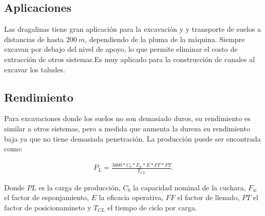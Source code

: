 \documentclass[a4paper]{article}
\begin{document}
\subsection{Aplicaciones}

Las dragalinas tiene gran aplicación para la excavación y y transporte de suelos
a distancias de hasta $\SI{200}{m}$, dependiendo de la pluma de la máquina. 
Siempre excavan por debajo del nivel de apoyo, lo que permite eliminar el costo
de extracción de otros sistemas.Es muy aplicado para la construcción de canales
al excavar los taludes.

\subsection{Rendimiento}

Para excavaciones donde los suelos no son demasiado duros, su rendimiento es similar
a otros sistemas, pero a medida que aumenta la dureza su rendimiento baja ya que
no tiene demasiada penetración. La producción puede ser encontrada como:

\begin{align*}
  P_L = \frac{3600*C_b * F_w * E * FF * PT}{T_{CL}}
.\end{align*}

Donde $PL$ es la carga de producción,  $C_b$ la capacidad nominal de la cuchara,
 $F_w$ el factor de esponjamiento,  $E$ la eficacia operativa, $FF$ el factor
 de llenado, $PT$ el factor de posicionamineto y $T_{CL}$ el tiempo de ciclo por
 carga. 
\end{document}
